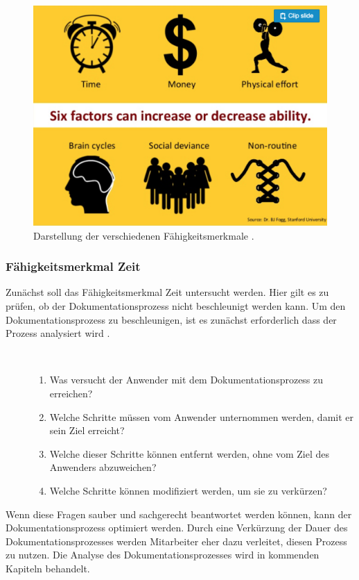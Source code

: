 \documentclass[a4paper,12pt,twoside]{scrartcl}
\begin{document}
\begin{figure}[h!]
\begin{center}
\includegraphics[scale = 0.4]{Bilder/Faehigkeitenfaktoren.eps}
\caption{Darstellung der verschiedenen Fähigkeitsmerkmale \cite{Merkmale2018}.}
\label{FähigkeitsmerkmaleBild}
\end{center}
\end{figure}
\subsubsection{Fähigkeitsmerkmal Zeit}
Zunächst soll das Fähigkeitsmerkmal Zeit untersucht werden. Hier gilt es zu prüfen, ob der Dokumentationsprozess nicht beschleunigt werden kann. Um den Dokumentationsprozess zu beschleunigen, ist es zunächst erforderlich dass der Prozess analysiert wird \cite{Hauptly2008}.\\
\begin{description}
   \item[\parbox{\textwidth}{Um den Dokumentationsprozess sachgemäß zu analysieren müssen die Folgenden Fragen beantwortet werden: \normalfont\vspace{0.5ex}}]~\par
   \begin{enumerate}
      \item Was versucht der Anwender mit dem Dokumentationsprozess zu erreichen?
      \item Welche Schritte müssen vom Anwender unternommen werden, damit er sein Ziel erreicht?
      \item Welche dieser Schritte können entfernt werden, ohne vom Ziel des Anwenders abzuweichen?
      \item Welche Schritte können modifiziert werden, um sie zu verkürzen?
   \end{enumerate}
\end{description}
Wenn diese Fragen sauber und sachgerecht beantwortet werden können, kann der Dokumentationsprozess optimiert werden. Durch eine Verkürzung der Dauer des Dokumentationsprozesses werden Mitarbeiter eher dazu verleitet, diesen Prozess zu nutzen. Die Analyse des Dokumentationsprozesses wird in kommenden Kapiteln behandelt.
\end{document}
